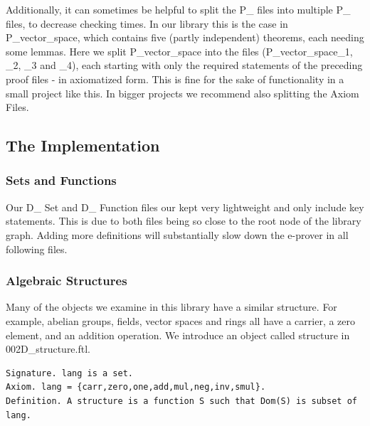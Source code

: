 \documentclass[11pt]{article}
\begin{document}
\begin{figure}[h]
\begin{center}
\end{center}
\end{figure}

Additionally, it can sometimes be helpful to split the P\_ files into multiple P\_ files, to decrease checking times. In our library this is the case in P\_vector\_space, which contains five (partly independent) theorems, each needing some lemmas. Here we split P\_vector\_space into the files (P\_vector\_space\_1, \_2, \_3 and \_4), each starting with only the required statements of the preceding proof files - in axiomatized form. This is fine for the sake of functionality in a small project like this. In bigger projects we recommend also splitting the Axiom Files.
\newpage

\subsection{The Implementation}

\subsubsection{Sets and Functions}

Our D\_ Set and D\_ Function files our kept very lightweight and only include key statements. This is due to both files being so close to the root node of the library graph. Adding more definitions will substantially slow down the e-prover in all following files.

\subsubsection{Algebraic Structures} \label{algebraicStructures}
Many of the objects we examine in this library have a similar structure. For example, abelian groups, fields, vector spaces and rings all have a carrier, a zero element, and an addition operation. We introduce an object called structure in 002D\_structure.ftl.
\begin{lstlisting}
Signature. lang is a set.
Axiom. lang = {carr,zero,one,add,mul,neg,inv,smul}.
Definition. A structure is a function S such that Dom(S) is subset of lang.
\end{lstlisting}
\end{document}

